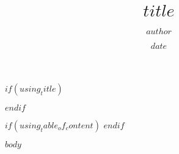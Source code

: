 \documentclass[12pt]{article}
\begin{document}
\title{$title$}
\author{$author$}
\date{$date$}

$if(using_title)$
    \maketitle
$endif$

$if(using_table_of_content)$
\tableofcontents 
$endif$

$body$
\end{document}
